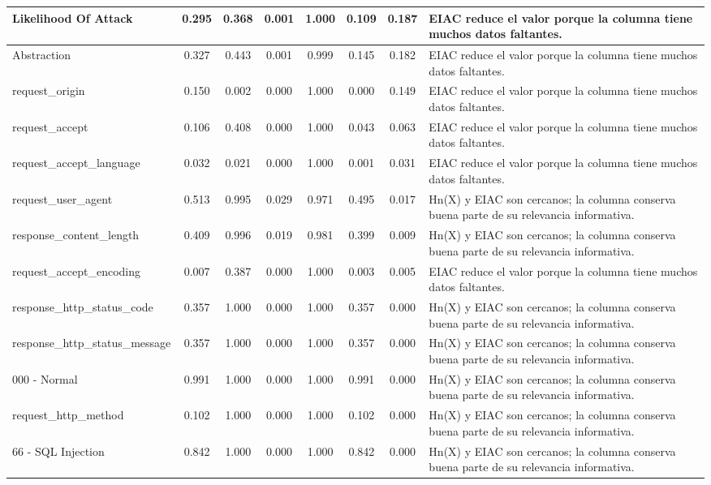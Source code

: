 \begin{table}[h]
\begin{tabular}{|p{3cm}|c|c|c|c|c|c|p{5cm}|}
\hline
Likelihood Of Attack & 0.295 & 0.368 & 0.001 & 1.000 & 0.109 & 0.187 & EIAC reduce el valor porque la columna tiene muchos datos faltantes. \\
\hline
Abstraction & 0.327 & 0.443 & 0.001 & 0.999 & 0.145 & 0.182 & EIAC reduce el valor porque la columna tiene muchos datos faltantes. \\
\hline
request\_origin & 0.150 & 0.002 & 0.000 & 1.000 & 0.000 & 0.149 & EIAC reduce el valor porque la columna tiene muchos datos faltantes. \\
\hline
request\_accept & 0.106 & 0.408 & 0.000 & 1.000 & 0.043 & 0.063 & EIAC reduce el valor porque la columna tiene muchos datos faltantes. \\
\hline
request\_accept\_language & 0.032 & 0.021 & 0.000 & 1.000 & 0.001 & 0.031 & EIAC reduce el valor porque la columna tiene muchos datos faltantes. \\
\hline
request\_user\_agent & 0.513 & 0.995 & 0.029 & 0.971 & 0.495 & 0.017 & Hn(X) y EIAC son cercanos; la columna conserva buena parte de su relevancia informativa. \\
\hline
response\_content\_length & 0.409 & 0.996 & 0.019 & 0.981 & 0.399 & 0.009 & Hn(X) y EIAC son cercanos; la columna conserva buena parte de su relevancia informativa. \\
\hline
request\_accept\_encoding & 0.007 & 0.387 & 0.000 & 1.000 & 0.003 & 0.005 & EIAC reduce el valor porque la columna tiene muchos datos faltantes. \\
\hline
response\_http\_status\_code & 0.357 & 1.000 & 0.000 & 1.000 & 0.357 & 0.000 & Hn(X) y EIAC son cercanos; la columna conserva buena parte de su relevancia informativa. \\
\hline
response\_http\_status\_message & 0.357 & 1.000 & 0.000 & 1.000 & 0.357 & 0.000 & Hn(X) y EIAC son cercanos; la columna conserva buena parte de su relevancia informativa. \\
\hline
000 - Normal & 0.991 & 1.000 & 0.000 & 1.000 & 0.991 & 0.000 & Hn(X) y EIAC son cercanos; la columna conserva buena parte de su relevancia informativa. \\
\hline
request\_http\_method & 0.102 & 1.000 & 0.000 & 1.000 & 0.102 & 0.000 & Hn(X) y EIAC son cercanos; la columna conserva buena parte de su relevancia informativa. \\
\hline
66 - SQL Injection & 0.842 & 1.000 & 0.000 & 1.000 & 0.842 & 0.000 & Hn(X) y EIAC son cercanos; la columna conserva buena parte de su relevancia informativa. \\

\end{tabular}
\end{table}
